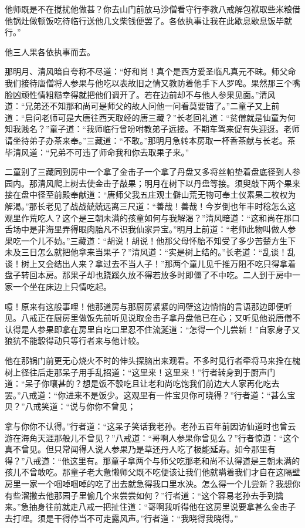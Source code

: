 \documentclass[12pt,UTF8]{ctexbook}
\begin{document}
他师既是不在搅扰他做甚？你去山门前放马沙僧看守行李教八戒解包袱取些米粮借他锅灶做顿饭吃待临行送他几文柴钱便罢了。各依执事让我在此歇息歇息饭毕就行。”

他三人果各依执事而去。

那明月、清风暗自夸称不尽道：“好和尚！真个是西方爱圣临凡真元不昧。师父命我们接待唐僧将人参果与他吃以表故旧之情又教防着他手下人罗唣。果然那三个嘴脸凶顽性情粗糙幸得就把他们调开了。若在边前却不与他人参果见面。”清风道：“兄弟还不知那和尚可是师父的故人问他一问看莫要错了。”二童子又上前道：“启问老师可是大唐往西天取经的唐三藏？”长老回礼道：“贫僧就是仙童为何知我贱名？”童子道：“我师临行曾吩咐教弟子远接。不期车驾来促有失迎迓。老师请坐待弟子办茶来奉。”三藏道：“不敢。”那明月急转本房取一杯香茶献与长老。茶毕清风道：“兄弟不可违了师命我和你去取果子来。”

二童别了三藏同到房中一个拿了金击子一个拿了丹盘又多将丝帕垫着盘底径到人参园内。那清风爬上树去使金击子敲果；明月在树下以丹盘等接。须臾敲下两个果来接在盘中径至前殿奉献道：“唐师父我五庄观土僻山荒无物可奉土仪素果二枚权为解渴。”那长老见了战战兢兢远离三尺道：“善哉！善哉！今岁倒也年丰时稔怎么这观里作荒吃人？这个是三朝未满的孩童如何与我解渴？”清风暗道：“这和尚在那口舌场中是非海里弄得眼肉胎凡不识我仙家异宝。”明月上前道：“老师此物叫做人参果吃一个儿不妨。”三藏道：“胡说！胡说！他那父母怀胎不知受了多少苦楚方生下未及三日怎么就把他拿来当果子？”清风道：“实是树上结的。”长老道：“乱谈！乱谈！树上又会结出人来？拿过去不当人子！”那两个童儿见千推万阻不吃只得拿着盘子转回本房。那果子却也跷蹊久放不得若放多时即僵了不中吃。二人到于房中一家一个坐在床边上只情吃起。

噫！原来有这般事哩！他那道房与那厨房紧紧的间壁这边悄悄的言语那边即便听见。八戒正在厨房里做饭先前听见说取金击子拿丹盘他已在心；又听见他说唐僧不认得是人参果即拿在房里自吃口里忍不住流涎道：“怎得一个儿尝新！”自家身子又狼犺不能彀得动只等行者来与他计较。

他在那锅门前更无心烧火不时的伸头探脑出来观看。不多时见行者牵将马来拴在槐树上径往后走那呆子用手乱招道：“这里来！这里来！”行者转身到于厨声门道：“呆子你嚷甚的？想是饭不彀吃且让老和尚吃饱我们前边大人家再化吃去罢。”八戒道：“你进来不是饭少。这观里有一件宝贝你可晓得？”行者道：“甚么宝贝？”八戒笑道：“说与你你不曾见；

拿与你你不认得。”行者道：“这呆子笑话我老孙。老孙五百年前因访仙道时也曾云游在海角天涯那般儿不曾见？”八戒道：“哥啊人参果你曾见么？”行者惊道：“这个真不曾见。但只常闻得人说人参果乃是草还丹人吃了极能延寿。如今那里有得？”八戒道：“他这里有。那童子拿两个与师父吃那老和尚不认得道是三朝未满的孩儿不曾敢吃。那童子老大惫懒师父既不吃便该让我们他就瞒着我们才自在这隔壁房里一家一个啯啅啯啅的吃了出去就急得我口里水泱。怎么得一个儿尝新？我想你有些溜撒去他那园子里偷几个来尝尝如何？”行者道：“这个容易老孙去手到擒来。”急抽身往前就走八戒一把扯住道：“哥啊我听得他在这房里说要拿甚么金击子去打哩。须是干得停当不可走露风声。”行者道：“我晓得我晓得。”
\end{document}
